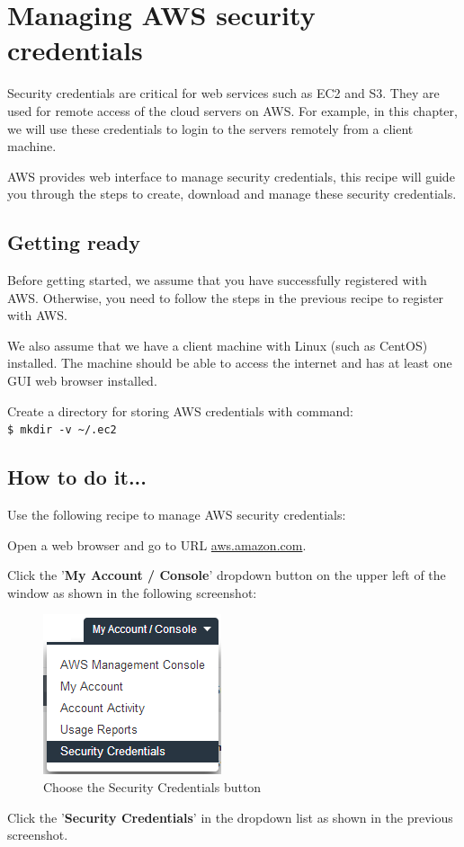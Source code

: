 \section{Managing AWS security credentials}
Security credentials are critical for web services such as EC2 and S3. They are used for remote access of the cloud servers on AWS. For example, in this chapter, we will use these credentials to login to the servers remotely from a client machine.

AWS provides web interface to manage security credentials, this recipe will guide you through the steps to create, download and manage these security credentials.
\subsection*{Getting ready}
Before getting started, we assume that you have successfully registered with AWS. Otherwise, you need to follow the steps in the previous recipe to register with AWS.

We also assume that we have a client machine with Linux (such as CentOS) installed. The machine should be able to access the internet and has at least one GUI web browser installed.

Create a directory for storing AWS credentials with command: \\
\verb|$ mkdir -v ~/.ec2|
\subsection*{How to do it...}
Use the following recipe to manage AWS security credentials:

Open a web browser and go to URL \url{aws.amazon.com}.

Click the '\textbf{My Account / Console}' dropdown button on the upper left of the window as shown in the following screenshot:
\begin{figure}[ht]
  \centering
  \includegraphics[width=.35\textwidth]{figs/5163os_08_07.png}
  \caption{Choose the Security Credentials button}\label{fig:secu.select}
\end{figure} 
Click the '\textbf{Security Credentials}' in the dropdown list as shown in the previous screenshot.

